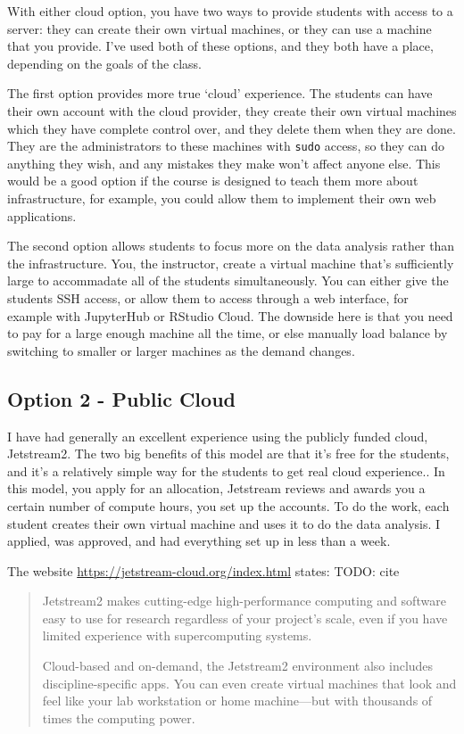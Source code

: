 \documentclass[12pt]{article}
\begin{document}
With either cloud option, you have two ways to provide students with access to a server: they can create their own virtual machines, or they can use a machine that you provide.
I've used both of these options, and they both have a place, depending on the goals of the class.

The first option provides more true `cloud' experience.
The students can have their own account with the cloud provider, they create their own virtual machines which they have complete control over, and they delete them when they are done.
They are the administrators to these machines with \texttt{sudo} access, so they can do anything they wish, and any mistakes they make won't affect anyone else.
This would be a good option if the course is designed to teach them more about infrastructure, for example, you could allow them to implement their own web applications.

The second option allows students to focus more on the data analysis rather than the infrastructure.
You, the instructor, create a virtual machine that's sufficiently large to accommadate all of the students simultaneously.
You can either give the students SSH access, or allow them to access through a web interface, for example with JupyterHub or RStudio Cloud.
The downside here is that you need to pay for a large enough machine all the time, or else manually load balance by switching to smaller or larger machines as the demand changes.



\subsection{Option 2 - Public Cloud}

I have had generally an excellent experience using the publicly funded cloud, Jetstream2.
The two big benefits of this model are that it's free for the students, and it's a relatively simple way for the students to get real cloud experience..
In this model, you apply for an allocation, Jetstream reviews and awards you a certain number of compute hours, you set up the accounts.
To do the work, each student creates their own virtual machine and uses it to do the data analysis.
I applied, was approved, and had everything set up in less than a week.

The website \url{https://jetstream-cloud.org/index.html} states:
TODO: cite

\begin{quote}
Jetstream2 makes cutting-edge high-performance computing and software easy to use for research regardless of your project’s scale, even if you have limited experience with supercomputing systems.

Cloud-based and on-demand, the Jetstream2 environment also includes discipline-specific apps. You can even create virtual machines that look and feel like your lab workstation or home machine—but with thousands of times the computing power.
\end{quote}
\end{document}
